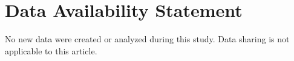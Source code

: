 \section*{Data Availability Statement}
{\small No new data were created or analyzed during this study. Data sharing is not applicable to this article.}\newpage
